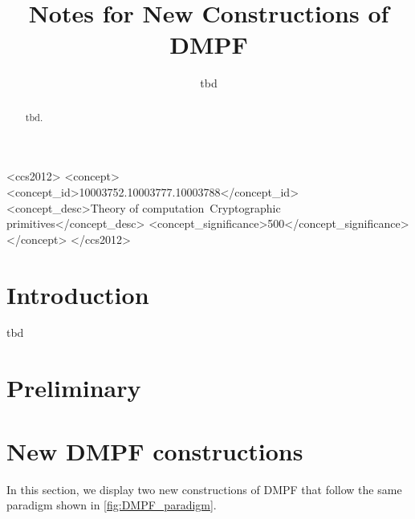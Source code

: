 \documentclass[sigconf]{acmart}
\begin{document}
\title{Notes for New Constructions of DMPF}

\author{tbd}

\renewcommand{\shortauthors}{tbd}

\begin{abstract}
  tbd. 
\end{abstract}

\begin{CCSXML}
  <ccs2012>
     <concept>
         <concept_id>10003752.10003777.10003788</concept_id>
         <concept_desc>Theory of computation~Cryptographic primitives</concept_desc>
         <concept_significance>500</concept_significance>
         </concept>
   </ccs2012>
\end{CCSXML}
  



\maketitle

\section{Introduction}
tbd

\section{Preliminary}
  
\section{New DMPF constructions}
In this section, we display two new constructions of DMPF that follow the same paradigm shown in \cref{fig:DMPF_paradigm}. 
\end{document}
